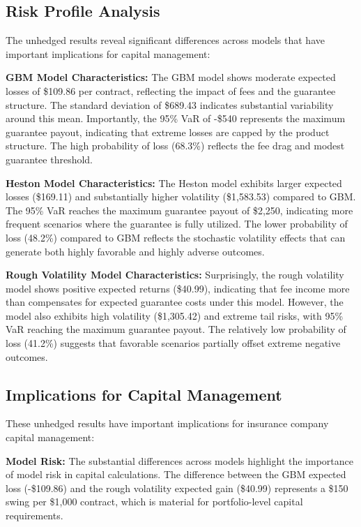 \documentclass[12pt,a4paper]{report}
\begin{document}
\subsection{Risk Profile Analysis}

The unhedged results reveal significant differences across models that have important implications for capital management:

\textbf{GBM Model Characteristics:}
The GBM model shows moderate expected losses of \$109.86 per contract, reflecting the impact of fees and the guarantee structure. The standard deviation of \$689.43 indicates substantial variability around this mean. Importantly, the 95\% VaR of -\$540 represents the maximum guarantee payout, indicating that extreme losses are capped by the product structure. The high probability of loss (68.3\%) reflects the fee drag and modest guarantee threshold.

\textbf{Heston Model Characteristics:}
The Heston model exhibits larger expected losses (\$169.11) and substantially higher volatility (\$1,583.53) compared to GBM. The 95\% VaR reaches the maximum guarantee payout of \$2,250, indicating more frequent scenarios where the guarantee is fully utilized. The lower probability of loss (48.2\%) compared to GBM reflects the stochastic volatility effects that can generate both highly favorable and highly adverse outcomes.

\textbf{Rough Volatility Model Characteristics:}
Surprisingly, the rough volatility model shows positive expected returns (\$40.99), indicating that fee income more than compensates for expected guarantee costs under this model. However, the model also exhibits high volatility (\$1,305.42) and extreme tail risks, with 95\% VaR reaching the maximum guarantee payout. The relatively low probability of loss (41.2\%) suggests that favorable scenarios partially offset extreme negative outcomes.

\subsection{Implications for Capital Management}

These unhedged results have important implications for insurance company capital management:

\textbf{Model Risk:} The substantial differences across models highlight the importance of model risk in capital calculations. The difference between the GBM expected loss (-\$109.86) and the rough volatility expected gain (\$40.99) represents a \$150 swing per \$1,000 contract, which is material for portfolio-level capital requirements.
\end{document}
